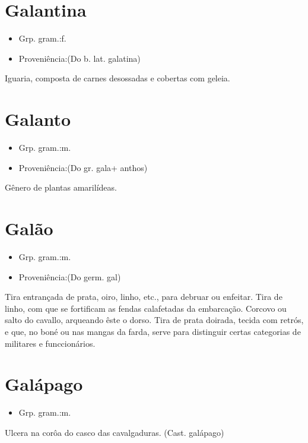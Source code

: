 \section{Galantina}
\begin{itemize}
\item {Grp. gram.:f.}
\end{itemize}
\begin{itemize}
\item {Proveniência:(Do b. lat. \textunderscore galatina\textunderscore )}
\end{itemize}
Iguaria, composta de carnes desossadas e cobertas com geleia.
\section{Galanto}
\begin{itemize}
\item {Grp. gram.:m.}
\end{itemize}
\begin{itemize}
\item {Proveniência:(Do gr. \textunderscore gala\textunderscore  + \textunderscore anthos\textunderscore )}
\end{itemize}
Gênero de plantas amarilídeas.
\section{Galão}
\begin{itemize}
\item {Grp. gram.:m.}
\end{itemize}
\begin{itemize}
\item {Proveniência:(Do germ. \textunderscore gal\textunderscore )}
\end{itemize}
Tira entrançada de prata, oiro, linho, etc., para debruar ou enfeitar.
Tira de linho, com que se fortificam as fendas calafetadas da embarcação.
Corcovo ou salto do cavallo, arqueando êste o dorso.
Tira de prata doirada, tecida com retrós, e que, no boné ou nas mangas da farda, serve para distinguir certas categorias de militares e funccionários.
\section{Galápago}
\begin{itemize}
\item {Grp. gram.:m.}
\end{itemize}
Ulcera na corôa do casco das cavalgaduras.
(Cast. \textunderscore galápago\textunderscore )
